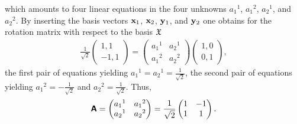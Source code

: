 {\begin{enumerate}
\begin{equation}
\end{equation}
which amounts to four linear equations in the four unknowns ${a_1}^1$, ${a_1}^2$,
${a_2}^1$, and ${a_2}^2$.
By
inserting the basis vectors
$ {\bf x}_1$, ${\bf x}_2$, ${\bf y}_1$, and ${\bf y}_2$
one obtains for the rotation matrix with respect to the basis ${\frak X}$
\begin{equation}
\begin{split}
\frac{1}{\sqrt{2}}
\begin{pmatrix}
1,1\\
-1,1
\end{pmatrix}
=
\begin{pmatrix}
{a_1}^1&{a_2}^1\\
{a_1}^2&{a_2}^2
\end{pmatrix}
\begin{pmatrix}
1,0 \\
0,1
\end{pmatrix}
,
\end{split}
\end{equation}
the first pair of equations yielding
${a_1}^1={a_2}^1=\frac{1}{\sqrt{2}}$,
the second pair of equations yielding
${a_1}^2=-\frac{1}{\sqrt{2}}$ and ${a_2}^2=\frac{1}{\sqrt{2}}$.
Thus,
\begin{equation}
 \textsf{\textbf{A}}=
\begin{pmatrix}
{a_1}^1&{a_1}^2\\
{a_2}^1&{a_2}^2
\end{pmatrix}
=
\frac{1}{\sqrt{2}}
\begin{pmatrix}
1&-1\\
1&1
\end{pmatrix}
.
\end{equation}


\end{enumerate}}
